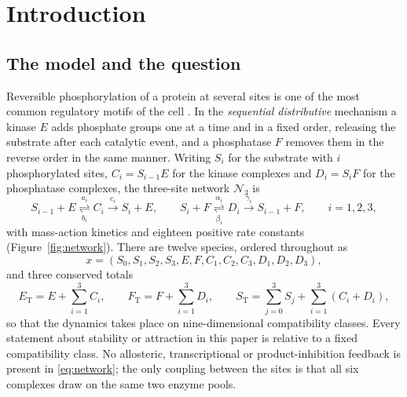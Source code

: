 \documentclass[11pt,a4paper]{article}
\theoremstyle{plain}
\theoremstyle{definition}
\theoremstyle{remark}
\newcommand{\cN}{\mathcal N}
\newcommand{\ET}{E_{\mathrm T}}
\newcommand{\FT}{F_{\mathrm T}}
\newcommand{\ST}{S_{\mathrm T}}
\begin{document}
\tableofcontents

\section{Introduction}\label{sec:intro}

\subsection{The model and the question}
Reversible phosphorylation of a protein at several sites is one of the most common regulatory motifs of the cell \cite{Cohen00}. In the \emph{sequential distributive} mechanism a kinase $E$ adds phosphate groups one at a time and in a fixed order, releasing the substrate after each catalytic event, and a phosphatase $F$ removes them in the reverse order in the same manner. Writing $S_i$ for the substrate with $i$ phosphorylated sites, $C_i=S_{i-1}E$ for the kinase complexes and $D_i=S_iF$ for the phosphatase complexes, the three-site network $\cN_3$ is
\begin{equation}\label{eq:network}
 S_{i-1}+E \underset{b_i}{\overset{a_i}{\rightleftharpoons}} C_i
 \overset{c_i}{\longrightarrow}S_i+E,\qquad
 S_i+F \underset{\beta_i}{\overset{\alpha_i}{\rightleftharpoons}}D_i
 \overset{\gamma_i}{\longrightarrow}S_{i-1}+F,
 \qquad i=1,2,3,
\end{equation}
with mass-action kinetics and eighteen positive rate constants (Figure~\ref{fig:network}). There are twelve species, ordered throughout as
\[
 x=(S_0,S_1,S_2,S_3,E,F,C_1,C_2,C_3,D_1,D_2,D_3),
\]
and three conserved totals
\begin{equation}\label{eq:totals}
 \ET=E+\sum_{i=1}^3 C_i,\qquad \FT=F+\sum_{i=1}^3 D_i,\qquad
 \ST=\sum_{j=0}^3S_j+\sum_{i=1}^3(C_i+D_i),
\end{equation}
so that the dynamics takes place on nine-dimensional compatibility classes. Every statement about stability or attraction in this paper is relative to a fixed compatibility class. No allosteric, transcriptional or product-inhibition feedback is present in \eqref{eq:network}; the only coupling between the sites is that all six complexes draw on the same two enzyme pools.
\end{document}
